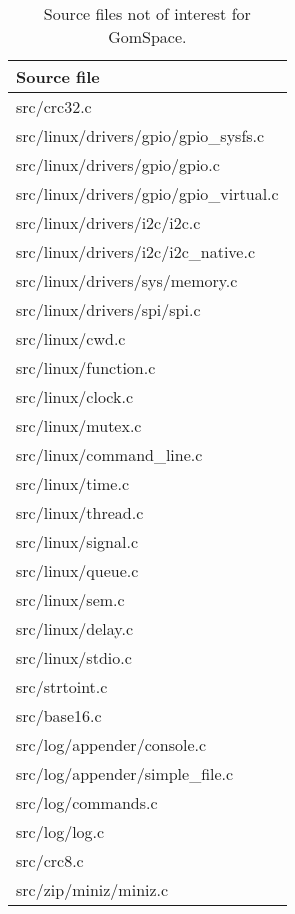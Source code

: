 
\begin{table}[tb]
\scriptsize
\centering
\caption{Source files not of interest for GomSpace.}
\label{table:not_interesting}
\begin{tabular}{l}
\hline
\textbf{Source file}\\
\hline
src/crc32.c\\
src/linux/drivers/gpio/gpio\_sysfs.c\\
src/linux/drivers/gpio/gpio.c\\
src/linux/drivers/gpio/gpio\_virtual.c\\
src/linux/drivers/i2c/i2c.c\\
src/linux/drivers/i2c/i2c\_native.c\\
src/linux/drivers/sys/memory.c\\
src/linux/drivers/spi/spi.c\\
src/linux/cwd.c\\
src/linux/function.c\\
src/linux/clock.c\\
src/linux/mutex.c\\
src/linux/command\_line.c\\
src/linux/time.c\\
src/linux/thread.c\\
src/linux/signal.c\\
src/linux/queue.c\\
src/linux/sem.c\\
src/linux/delay.c\\
src/linux/stdio.c\\
src/strtoint.c\\
src/base16.c\\
src/log/appender/console.c\\
src/log/appender/simple\_file.c\\
src/log/commands.c\\
src/log/log.c\\
src/crc8.c\\
src/zip/miniz/miniz.c\\
\hline
\end{tabular}
\end{table}